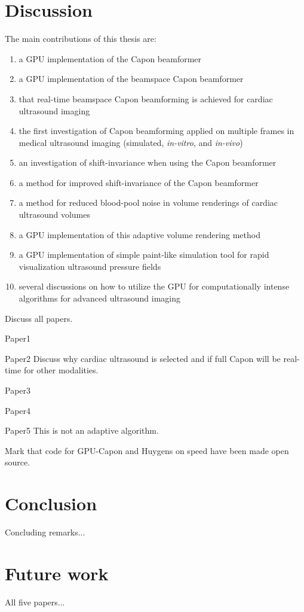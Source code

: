 \section{Discussion}
The main contributions of this thesis are:
\begin{enumerate}
\item a GPU implementation of the Capon beamformer
\item a GPU implementation of the beamspace Capon beamformer
\item that real-time beamspace Capon beamforming is achieved for cardiac ultrasound imaging
\item the first investigation of Capon beamforming applied on multiple frames in medical ultrasound imaging (simulated, \textit{in-vitro}, and \textit{in-vivo})
\item an investigation of shift-invariance when using the Capon beamformer
\item a method for improved shift-invariance of the Capon beamformer
\item a method for reduced blood-pool noise in volume renderings of cardiac ultrasound volumes
\item a GPU implementation of this adaptive volume rendering method
\item a GPU implementation of simple paint-like simulation tool for rapid visualization ultrasound pressure fields
\item several discussions on how to utilize the GPU for computationally intense algorithms for advanced ultrasound imaging 
\end{enumerate}

Discuss all papers.

Paper1

Paper2
Discuss why cardiac ultrasound is selected and if full Capon will be real-time for other modalities.

Paper3

Paper4

Paper5
This is not an adaptive algorithm.

Mark that code for GPU-Capon and Huygens on speed have been made open source.

\section{Conclusion}

Concluding remarks...

\section{Future work}

All five papers...

\endinput